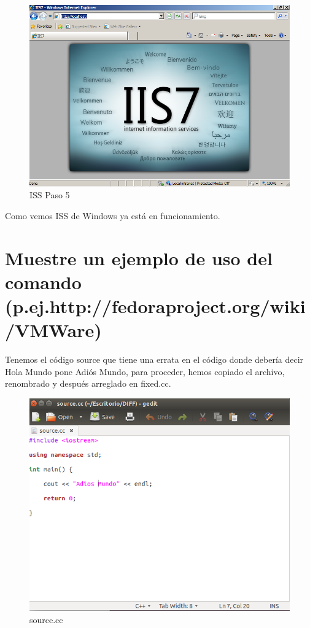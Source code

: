 	\begin{figure}[H]
	\centering
	\includegraphics[scale=0.35]{pics/gui5.png} 
	\caption{ISS Paso 5} \label{fig:iss5}
	\end{figure}

Como vemos ISS de Windows ya está en funcionamiento.



\section[Cuestión 11]{Muestre un ejemplo de uso del comando (p.ej.http://fedoraproject.org/wiki/VMWare)}

Tenemos el código source que tiene una errata en el código donde debería decir Hola Mundo pone Adiós Mundo, para proceder, hemos copiado el archivo, renombrado y después arreglado en fixed.cc.

	\begin{figure}[H]
	\centering
	\includegraphics[scale=0.35]{pics/source.png}  
	\caption{source.cc} \label{fig:source.cc}
	\end{figure}

